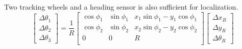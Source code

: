 \documentclass{article}
\begin{document}
Two tracking wheels and a heading sensor is also sufficient for localization.
$$
\begin{bmatrix}
    \Delta \theta_1\\
    \Delta \theta_2\\
    \Delta \theta_3
\end{bmatrix}
=
\frac{1}{R}
\begin{bmatrix}
    \operatorname{cos} \phi_1 & \operatorname{sin} \phi_1 & x_1 \operatorname{sin} \phi_1 - y_1 \operatorname{cos} \phi_1 \\
    \operatorname{cos} \phi_2 & \operatorname{sin} \phi_2 & x_2 \operatorname{sin} \phi_2 - y_2 \operatorname{cos} \phi_2 \\
    0 & 0 & R\\
\end{bmatrix}
\begin{bmatrix}
    \Delta x_R\\
    \Delta y_R\\
    \Delta \theta_R
\end{bmatrix}
$$
\end{document}
